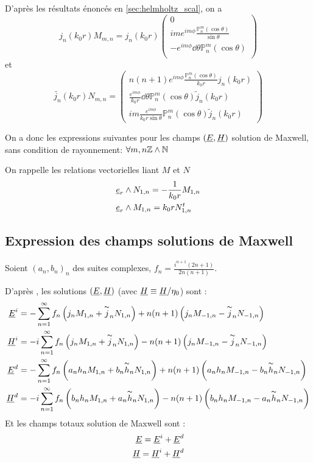 D'après les résultats énoncés en \ref{sec:helmholtz_scal}, on a
\[
  j_n(k_0r)M_{m,n} = j_n(k_0r)
  \begin{pmatrix}
    0\\
    ime^{im\phi}\frac{\mathbb{P}^m_n(\cos\theta)}{\sin\theta}\\
    -e^{im\phi}\dd{\theta}{\mathbb{P}^m_n(\cos\theta)}\\
  \end{pmatrix}
\]
et 
\[
  \tilde{j_n}(k_0r)N_{m,n}=
    \begin{pmatrix}
    n(n+1)e^{im\phi}\frac{\mathbb{P}^m_n(\cos\theta)}{k_0r}j_n(k_0r)\\
    \frac{e^{im\phi}}{k_0r}\dd{\theta}{\mathbb{P}^m_n(\cos\theta)}\tilde j_n(k_0r)\\
    im\frac{e^{im\phi}}{k_0r\sin\theta}\mathbb{P}^m_n(\cos\theta)\tilde j_n(k_0r)
  \end{pmatrix}
\]

On a donc les expressions suivantes pour les champs $(\underline{E},\underline{H})$ solution de Maxwell, sans condition de rayonnement:
$\forall m,n \mathbb Z\wedge\mathbb N$




On rappelle les relations vectorielles liant $M$ et $N$
\begin{align*}
  &\underline{e}_r \wedge N_{1,n} = -\dfrac{1}{k_0r}M_{1,n} \\
  &\underline{e}_r \wedge M_{1,n} = k_0r N_{1,n}^t
\end{align*}

\subsection{Expression des champs solutions de Maxwell}
Soient $(a_n,b_n)_n$ des suites complexes, $f_n = \frac{i^{n+1}(2n+1)}{2n(n+1)}$.

D’après \cite{morse_methods_1953,marceaux_etude_1997}, les solutions $(\underline{E},\underline{H})$ (avec $\underline{H} \equiv \underline{H} /\eta_0 $) sont :
\begin{align*}
  \underline{E}^i &= -\sum_{n=1}^\infty f_n \left( j_nM_{1,n} + \overset{\thicksim}{j}_n N_{1,n} \right) + n(n+1)\left(j_n M_{-1,n} - \overset{\thicksim}{j}_nN_{-1,n} \right)\\
  \underline{H}^i &= -i\sum_{n=1}^\infty f_n \left( j_nM_{1,n} + \overset{\thicksim}{j}_nN_{1,n} \right) - n(n+1)\left(j_n M_{-1,n} - \overset{\thicksim}{j}_n N_{-1,n} \right)\\
  \underline{E}^d &= -\sum_{n=1}^\infty f_n \left( a_n h_nM_{1,n} + b_n\overset{\thicksim}{h}_nN_{1,n} \right) + n(n+1)\left(a_nh_nM_{-1,n} - b_n\overset{\thicksim}{h}_nN_{-1,n} \right)\\
  \underline{H}^d &= -i\sum_{n=1}^\infty f_n \left( b_nh_nM_{1,n} + a_n\overset{\thicksim}{h}_nN_{1,n} \right) - n(n+1)\left(b_nh_nM_{-1,n} - a_n\overset{\thicksim}{h}_nN_{-1,n} \right)\\
\end{align*}
Et les champs totaux solution de Maxwell sont : 
\begin{align}
  \underline{E} = \underline{E}^i + \underline{E}^d\label{eq:solEmie}\\
  \underline{H} = \underline{H}^i + \underline{H}^d\label{eq:solHmie}
\end{align}

